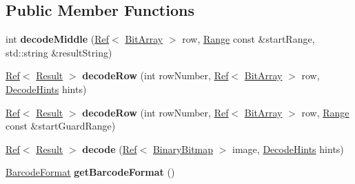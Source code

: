 \subsection*{Public Member Functions}
\begin{DoxyCompactItemize}
\item 
\mbox{\label{classzxing_1_1oned_1_1_u_p_c_a_reader_ab8bb6943bf12b9c001e359572a5c907c}} 
int {\bfseries decode\+Middle} (\mbox{\hyperlink{classzxing_1_1_ref}{Ref}}$<$ \mbox{\hyperlink{classzxing_1_1_bit_array}{Bit\+Array}} $>$ row, \mbox{\hyperlink{structzxing_1_1oned_1_1_one_d_reader_1_1_range}{Range}} const \&start\+Range, std\+::string \&result\+String)
\item 
\mbox{\label{classzxing_1_1oned_1_1_u_p_c_a_reader_a0632bb5e7832af3b0bcbd345fb735346}} 
\mbox{\hyperlink{classzxing_1_1_ref}{Ref}}$<$ \mbox{\hyperlink{classzxing_1_1_result}{Result}} $>$ {\bfseries decode\+Row} (int row\+Number, \mbox{\hyperlink{classzxing_1_1_ref}{Ref}}$<$ \mbox{\hyperlink{classzxing_1_1_bit_array}{Bit\+Array}} $>$ row, \mbox{\hyperlink{classzxing_1_1_decode_hints}{Decode\+Hints}} hints)
\item 
\mbox{\label{classzxing_1_1oned_1_1_u_p_c_a_reader_a65388d83a035066fadd2fc493a362077}} 
\mbox{\hyperlink{classzxing_1_1_ref}{Ref}}$<$ \mbox{\hyperlink{classzxing_1_1_result}{Result}} $>$ {\bfseries decode\+Row} (int row\+Number, \mbox{\hyperlink{classzxing_1_1_ref}{Ref}}$<$ \mbox{\hyperlink{classzxing_1_1_bit_array}{Bit\+Array}} $>$ row, \mbox{\hyperlink{structzxing_1_1oned_1_1_one_d_reader_1_1_range}{Range}} const \&start\+Guard\+Range)
\item 
\mbox{\label{classzxing_1_1oned_1_1_u_p_c_a_reader_af4c62a0ee77f0cece6ca9150f666f46d}} 
\mbox{\hyperlink{classzxing_1_1_ref}{Ref}}$<$ \mbox{\hyperlink{classzxing_1_1_result}{Result}} $>$ {\bfseries decode} (\mbox{\hyperlink{classzxing_1_1_ref}{Ref}}$<$ \mbox{\hyperlink{classzxing_1_1_binary_bitmap}{Binary\+Bitmap}} $>$ image, \mbox{\hyperlink{classzxing_1_1_decode_hints}{Decode\+Hints}} hints)
\item 
\mbox{\label{classzxing_1_1oned_1_1_u_p_c_a_reader_a285710a27ebf469f3f83890ed171935e}} 
\mbox{\hyperlink{classzxing_1_1_barcode_format}{Barcode\+Format}} {\bfseries get\+Barcode\+Format} ()
\end{DoxyCompactItemize}
